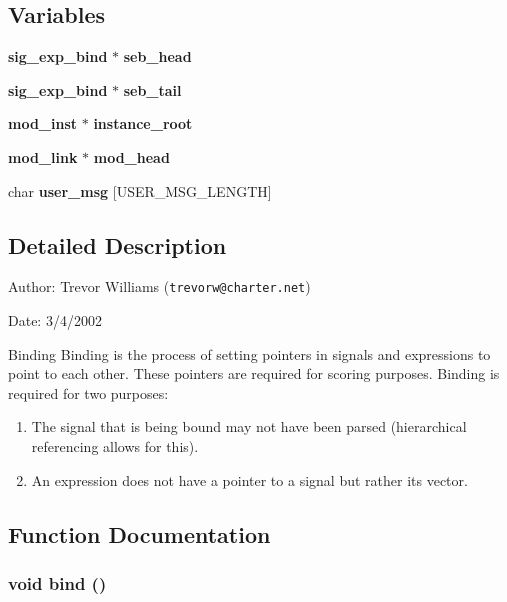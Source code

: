 \subsection*{Variables}
\begin{CompactItemize}
\item 
{\bf sig\_\-exp\_\-bind} $\ast$ {\bf seb\_\-head}
\item 
{\bf sig\_\-exp\_\-bind} $\ast$ {\bf seb\_\-tail}
\item 
{\bf mod\_\-inst} $\ast$ {\bf instance\_\-root}
\item 
{\bf mod\_\-link} $\ast$ {\bf mod\_\-head}
\item 
char {\bf user\_\-msg} [USER\_\-MSG\_\-LENGTH]
\end{CompactItemize}


\subsection{Detailed Description}
\begin{Desc}
\item[Author:]Trevor Williams ({\tt trevorw@charter.net}) \end{Desc}
\begin{Desc}
\item[Date:]3/4/2002\end{Desc}
\begin{Desc}
\item[Binding]Binding is the process of setting pointers in signals and expressions to point to each other. These pointers are required for scoring purposes. Binding is required for two purposes:\begin{enumerate}
\item The signal that is being bound may not have been parsed (hierarchical referencing allows for this).\item An expression does not have a pointer to a signal but rather its vector.\end{enumerate}
\end{Desc}


\subsection{Function Documentation}
\subsubsection{\setlength{\rightskip}{0pt plus 5cm}void bind ()}\label{binding_8c_a8}


